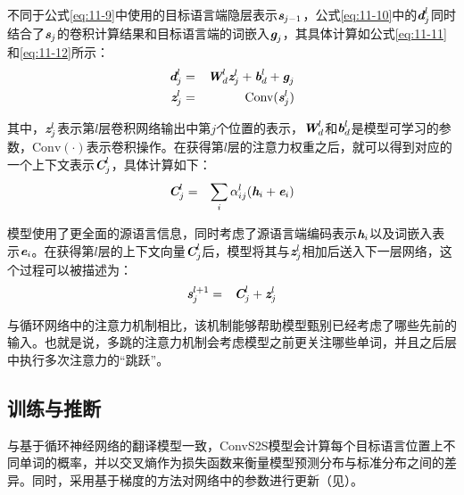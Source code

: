 \noindent 不同于公式\eqref{eq:11-9}中使用的目标语言端隐层表示$\textbf{\em s}_{j-1}$，公式\eqref{eq:11-10}中的$\textbf{\em d}_{j}^l$同时结合了$\textbf{\em s}_{j}$的卷积计算结果和目标语言端的词嵌入$\textbf{\em g}_j$，其具体计算如公式\eqref{eq:11-11}和\eqref{eq:11-12}所示：
\begin{eqnarray}
\textbf{\em d}_{j}^l &=& \textbf{\em W}_{d}^{l} \textbf{\em z}_{j}^{l} + \textbf{\em b}_{d}^{l} + \textbf{\em g}_j \label{eq:11-11} \\
\textbf{\em z}_j^l &=& \textrm{Conv}(\textbf{\em s}_j^l) \label{eq:11-12}
\end{eqnarray}

\noindent 其中，$\textbf{\em z}_j^l$表示第$l$层卷积网络输出中第$j$个位置的表示，$\textbf{\em W}_{d}^{l}$和$\textbf{\em b}_{d}^{l}$是模型可学习的参数，$\textrm{Conv}(\cdot)$表示卷积操作。在获得第$l$层的注意力权重之后，就可以得到对应的一个上下文表示$\textbf{\em C}_j^l$，具体计算如下：
\begin{eqnarray}
\textbf{\em C}_j^l &=& \sum_i \alpha_{ij}^l (\textbf{\em h}_i + \textbf{\em e}_i)
\label{eq:11-13}
\end{eqnarray}

\noindent 模型使用了更全面的源语言信息，同时考虑了源语言端编码表示$\textbf{\em h}_i$以及词嵌入表示$\textbf{\em e}_i$。在获得第$l$层的上下文向量$\textbf{\em C}_j^l$后，模型将其与$\textbf{\em z}_j^l$相加后送入下一层网络，这个过程可以被描述为：
\begin{eqnarray}
\textbf{\em s}_j^{l+1} &=& \textbf{\em C}_j^l + \textbf{\em z}_j^l
\label{eq:11-14}
\end{eqnarray}

\noindent 与循环网络中的注意力机制相比，该机制能够帮助模型甄别已经考虑了哪些先前的输入。也就是说，多跳的注意力机制会考虑模型之前更关注哪些单词，并且之后层中执行多次注意力的“跳跃”。


\subsection{训练与推断}

\parinterval 与基于循环神经网络的翻译模型一致，ConvS2S模型会计算每个目标语言位置上不同单词的概率，并以交叉熵作为损失函数来衡量模型预测分布与标准分布之间的差异。同时，采用基于梯度的方法对网络中的参数进行更新（见{\chapternine}）。

